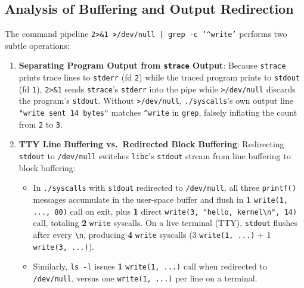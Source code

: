 \documentclass[12pt,a4paper]{article}
\begin{document}
\subsection{Analysis of Buffering and Output Redirection}
The command pipeline \texttt{2>\&1 >/dev/null | grep -c '\^{}write'} performs two subtle operations:
\begin{enumerate}
    \item \textbf{Separating Program Output from \texttt{strace} Output}: Because \texttt{strace} prints trace lines to \texttt{stderr} (fd \texttt{2}) while the traced program prints to \texttt{stdout} (fd \texttt{1}), \texttt{2>\&1} sends \texttt{strace}'s \texttt{stderr} into the pipe while \texttt{>/dev/null} discards the program's \texttt{stdout}. Without \texttt{>/dev/null}, \texttt{./syscalls}'s own output line \texttt{"write sent 14 bytes"} matches \texttt{\^{}write} in \texttt{grep}, falsely inflating the count from \texttt{2} to \texttt{3}.
    \item \textbf{TTY Line Buffering vs.\ Redirected Block Buffering}: Redirecting \texttt{stdout} to \texttt{/dev/null} switches \texttt{libc}'s \texttt{stdout} stream from line buffering to block buffering:
    \begin{itemize}
        \item In \texttt{./syscalls} with \texttt{stdout} redirected to \texttt{/dev/null}, all three \texttt{printf()} messages accumulate in the user-space buffer and flush in \textbf{1} \texttt{write(1, ..., 80)} call on exit, plus \textbf{1} direct \texttt{write(3, "hello, kernel\textbackslash n", 14)} call, totaling \textbf{2} \texttt{write} syscalls. On a live terminal (TTY), \texttt{stdout} flushes after every \texttt{\textbackslash n}, producing \textbf{4} \texttt{write} syscalls (3 \texttt{write(1, ...)} + 1 \texttt{write(3, ...)}).
        \item Similarly, \texttt{ls -l} issues \textbf{1} \texttt{write(1, ...)} call when redirected to \texttt{/dev/null}, versus one \texttt{write(1, ...)} per line on a terminal.
    \end{itemize}
\end{enumerate}
\end{document}
